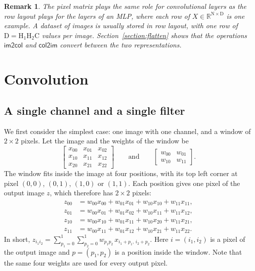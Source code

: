 \documentclass[twoside,11pt]{article}
\newtheorem{remark}{Remark}
\newcommand{\const}[1]{\ensuremath{\mathrm{#1}}} %
\newcommand{\func}[1]{\ensuremath{\textsf{#1}}}  %
\newcommand{\Reals}{\mathbb{R}}
\newcommand{\Hin}{\const{H}}         %
\newcommand{\im}{\func{im2col}}
\newcommand{\ci}{\func{col2im}}
\begin{document}
\begin{remark}
The pixel matrix plays the same role for convolutional layers as the row layout plays for the layers of an MLP, where each row of $X \in \Reals^{\const{N} \times \const{D}}$ is one example.
A dataset of images is usually stored in row layout, with one row of $\const{D} = \Hin_1 \Hin_2 \const{C}$ values per image.
Section~\ref{section:flatten} shows that the operations \im{} and \ci{} convert between the two representations.
\end{remark}

\section{Convolution} \label{section:convolution}

\subsection{A single channel and a single filter}
We first consider the simplest case: one image with one channel, and a window of $2 \times 2$ pixels.
Let the image and the weights of the window be
\[
\begin{bmatrix}
x_{00} & x_{01} & x_{02} \\
x_{10} & x_{11} & x_{12} \\
x_{20} & x_{21} & x_{22}
\end{bmatrix}
\qquad\text{and}\qquad
\begin{bmatrix}
w_{00} & w_{01} \\
w_{10} & w_{11}
\end{bmatrix}.
\]
The window fits inside the image at four positions, with its top left corner at pixel $(0,0)$, $(0,1)$, $(1,0)$ or $(1,1)$.
Each position gives one pixel of the output image $z$, which therefore has $2 \times 2$ pixels:
\begin{align*}
z_{00} &= w_{00} x_{00} + w_{01} x_{01} + w_{10} x_{10} + w_{11} x_{11}, \\
z_{01} &= w_{00} x_{01} + w_{01} x_{02} + w_{10} x_{11} + w_{11} x_{12}, \\
z_{10} &= w_{00} x_{10} + w_{01} x_{11} + w_{10} x_{20} + w_{11} x_{21}, \\
z_{11} &= w_{00} x_{11} + w_{01} x_{12} + w_{10} x_{21} + w_{11} x_{22}.
\end{align*}
In short, $z_{i_1 i_2} = \sum_{p_1 = 0}^{1} \sum_{p_2 = 0}^{1} w_{p_1 p_2}\, x_{i_1 + p_1,\, i_2 + p_2}$.
Here $i = (i_1, i_2)$ is a pixel of the output image and $p = (p_1, p_2)$ is a position inside the window.
Note that the same four weights are used for every output pixel.
\end{document}
